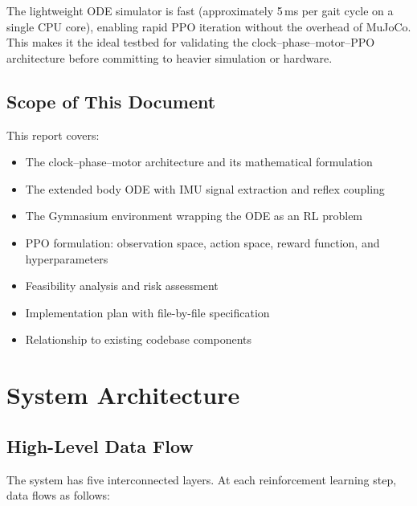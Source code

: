 \documentclass[11pt]{article}
\begin{document}
The lightweight ODE simulator is fast (approximately 5\,ms per gait cycle on a single CPU core), enabling rapid PPO iteration without the overhead of MuJoCo. This makes it the ideal testbed for validating the clock--phase--motor--PPO architecture before committing to heavier simulation or hardware.

\subsection{Scope of This Document}

This report covers:
\begin{itemize}
    \item The clock--phase--motor architecture and its mathematical formulation
    \item The extended body ODE with IMU signal extraction and reflex coupling
    \item The Gymnasium environment wrapping the ODE as an RL problem
    \item PPO formulation: observation space, action space, reward function, and hyperparameters
    \item Feasibility analysis and risk assessment
    \item Implementation plan with file-by-file specification
    \item Relationship to existing codebase components
\end{itemize}

\section{System Architecture}
\label{sec:architecture}

\subsection{High-Level Data Flow}

The system has five interconnected layers. At each reinforcement learning step, data flows as follows:
\end{document}
